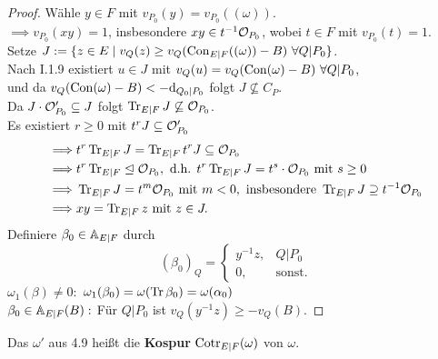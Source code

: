 \begin{proof}
    Wähle $y \in F$ mit $v_{P_0}(y) = v_{P_0}((\omega))$.\\
    $\implies v_{P_0}(xy) = 1$, insbesondere $xy \in t^{-1}\mathcal{O}_{P_0}$, wobei $t \in F$ mit $v_{P_0}(t) = 1$.\\
    Setze $J := \{z \in E \mid v_Q(z) \geq v_Q(\operatorname{Con}_{E|F}((\omega)) - B)~\forall Q|P_0\}$.\\
    Nach I.1.9 existiert $u \in J$ mit $v_Q(u) = v_Q(\operatorname{Con}(\omega)-B)~\forall Q|P_0$, \\
    und da $v_Q(\operatorname{Con}(\omega)-B) < -\mathrm{d}_{Q_0|P_0}$ folgt $J \not \subseteq C_P$.\\
    Da $J\cdot\mathcal{O}'_{P_0} \subseteq J$ folgt $\operatorname{Tr}_{E|F} J \not \subseteq \mathcal{O}_{P_0}$.\\
    Es existiert $r \geq 0$ mit $t^r J \subseteq \mathcal{O}'_{P_0}$
    \begin{align*}
        \implies & t^r\operatorname{Tr}_{E|F}J = \operatorname{Tr}_{E|F} t^r J \subseteq \mathcal{O}_{P_0}\\
        \implies & t^r \operatorname{Tr}_{E|F} \trianglelefteq \mathcal{O}_{P_0}, \text{ d.h. } t^r \operatorname{Tr}_{E|F}J = t^s \cdot \mathcal{O}_{P_0} \text{ mit } s \geq 0\\
        \implies & \operatorname{Tr}_{E|F}J = t^m \mathcal{O}_{P_0} \text{ mit } m < 0, \text{ insbesondere } \operatorname{Tr}_{E|F}J \supseteq t^{-1}\mathcal{O}_{P_0}\\
        \implies & xy = \operatorname{Tr}_{E|F} z \text{ mit } z \in J.
    \end{align*}
    Definiere $\beta_0 \in \mathbb{A}_{E|F}$ durch
    $$ (\beta_0)_Q = \begin{cases}
        y^{-1}z, & Q|P_0\\
        0, & \text{sonst}.
    \end{cases}$$
    $\omega_1(\beta) \ne 0:$ $\omega_1(\beta_0) = \omega(\operatorname{Tr} \beta_0) = \omega(\alpha_0)$\\
    $\beta_0 \in \mathbb{A}_{E|F}(B):$ Für $Q|P_0$ ist $v_Q(y^{-1}z) \geq -v_Q(B)$.
\end{proof}

\begin{definition}
    Das $\omega'$ aus 4.9 heißt die \textbf{Kospur} $\operatorname{Cotr}_{E|F}(\omega)$ von $\omega$.
\end{definition}

